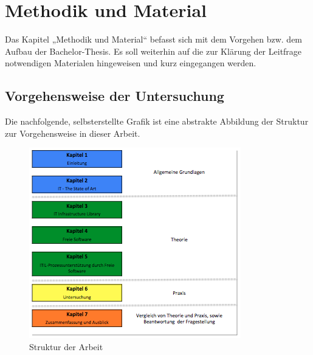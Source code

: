 
\chapter{Methodik und Material}
\label{ch:ITStateOfArt}

Das Kapitel „Methodik und Material“ befasst sich mit dem Vorgehen bzw. dem Aufbau der Bachelor-Thesis. Es soll weiterhin auf die zur Klärung der Leitfrage notwendigen Materialen hingeweisen und kurz eingegangen werden.

\section{Vorgehensweise der Untersuchung}

Die nachfolgende, selbsterstellte Grafik ist eine abstrakte Abbildung der Struktur zur Vorgehensweise in dieser Arbeit.

\begin{figure}[H]
 \centering
 \includegraphics[scale=0.7]{images/Struktur_der_BA_v2.png}
 \caption{Struktur der Arbeit}
 \label{fig:Struktur_BA}
\end{figure}


